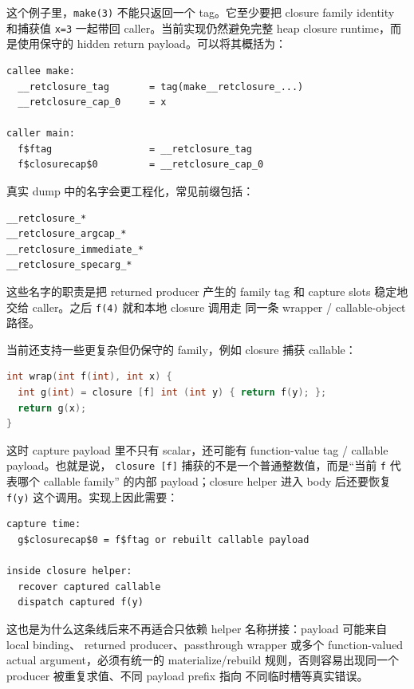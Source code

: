 \documentclass[UTF8,a4paper,11pt]{ctexart}
\begin{document}
这个例子里，\texttt{make(3)} 不能只返回一个 tag。它至少要把 closure family identity 和捕获值
\texttt{x=3} 一起带回 caller。当前实现仍然避免完整 heap closure runtime，而是使用保守的
hidden return payload。可以将其概括为：

\begin{lstlisting}[language={}]
callee make:
  __retclosure_tag       = tag(make__retclosure_...)
  __retclosure_cap_0     = x

caller main:
  f$ftag                 = __retclosure_tag
  f$closurecap$0         = __retclosure_cap_0
\end{lstlisting}

真实 dump 中的名字会更工程化，常见前缀包括：

\begin{lstlisting}[language={}]
__retclosure_*
__retclosure_argcap_*
__retclosure_immediate_*
__retclosure_specarg_*
\end{lstlisting}

这些名字的职责是把 returned producer 产生的 family tag 和 capture slots 稳定地交给
caller。之后 \texttt{f(4)} 就和本地 closure 调用走
同一条 wrapper / callable-object 路径。

当前还支持一些更复杂但仍保守的 family，例如 closure 捕获 callable：

\begin{lstlisting}[language=C]
int wrap(int f(int), int x) {
  int g(int) = closure [f] int (int y) { return f(y); };
  return g(x);
}
\end{lstlisting}

这时 capture payload 里不只有 scalar，还可能有 function-value tag / callable payload。也就是说，
\texttt{closure [f]} 捕获的不是一个普通整数值，而是“当前 \texttt{f} 代表哪个 callable family”
的内部 payload；closure helper 进入 body 后还要恢复 \texttt{f(y)} 这个调用。实现上因此需要：

\begin{lstlisting}[language={}]
capture time:
  g$closurecap$0 = f$ftag or rebuilt callable payload

inside closure helper:
  recover captured callable
  dispatch captured f(y)
\end{lstlisting}

这也是为什么这条线后来不再适合只依赖 helper 名称拼接：payload 可能来自 local binding、
returned producer、passthrough wrapper 或多个 function-valued actual argument，必须有统一的
materialize/rebuild 规则，否则容易出现同一个 producer 被重复求值、不同 payload prefix 指向
不同临时槽等真实错误。
\end{document}
